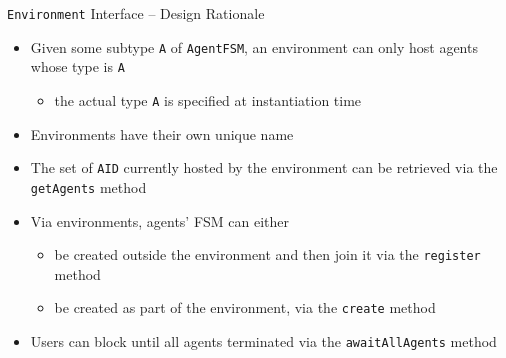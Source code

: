 \documentclass[presentation]{beamer}\mode<presentation>{\usetheme{AMSCesenaPurpleAndGold}}
\begin{document}
\begin{frame}{\texttt{Environment} Interface -- Design Rationale}
    
    \begin{itemize}
    		
    	\item Given some subtype \texttt{A} of \texttt{AgentFSM}, an environment can only host agents whose type is \texttt{A}
    	\begin{itemize}
    		\item the actual type \texttt{A} is specified at instantiation time
    	\end{itemize}
    
	    \vfill
	    
	    \item Environments have their own unique name
    	
    	\vfill
    	
    	\item The set of \texttt{AID} currently hosted by the environment can be retrieved via the \alert{\texttt{getAgents}} method
    	
    	\vfill
        
        \item Via environments, agents' FSM can either
        \begin{itemize}
            \item be created outside the environment and then join it via the \alert{\texttt{register}} method
            \item be created as part of the environment, via the \alert{\texttt{create}} method
        \end{itemize}
    
    	\vfill
    	
    	\item Users can block until all agents terminated via the \alert{\texttt{awaitAllAgents}} method
        
    \end{itemize}
    
\end{frame}
\end{document}
